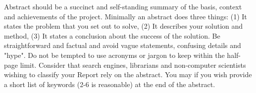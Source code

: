 Abstract should be a succinct and self-standing summary of the basis, context and achievements of the project. Minimally an abstract does three things: (1) It states the problem that you set out to solve, (2) It describes your solution and method, (3) It states a conclusion about the success of the solution. Be straightforward and factual and avoid vague statements, confusing details and "hype". Do not be tempted to use acronyms or jargon to keep within the half-page limit. Consider that search engines, librarians and non-computer scientists wishing to classify your Report rely on the abstract. You may if you wish provide a short list of keywords (2-6 is reasonable) at the end of the abstract.